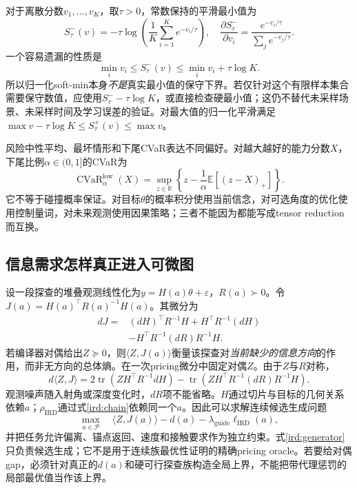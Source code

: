 \documentclass[11pt,a4paper]{article}
\numberwithin{equation}{section}
\theoremstyle{definition}
\DeclareMathOperator{\tr}{tr}
\newcommand{\R}{\mathbb R}
\newcommand{\E}{\mathbb E}
\begin{document}
对于离散分数$v_1,\ldots,v_K$，取$\tau>0$，常数保持的平滑最小值为
\begin{equation}
 S^-_\tau(v)=-\tau\log\left(\frac1K\sum_{i=1}^Ke^{-v_i/\tau}\right),
 \quad
 \frac{\partial S^-_\tau}{\partial v_i}
 =\frac{e^{-v_i/\tau}}{\sum_j e^{-v_j/\tau}}.
 \label{ird:softmin}
\end{equation}
一个容易遗漏的性质是
\begin{equation}
 \min_i v_i\leq S^-_\tau(v)\leq\min_i v_i+\tau\log K.
 \label{ird:softbound}
\end{equation}
所以归一化soft-min本身\emph{不是}真实最小值的保守下界。若仅针对这个有限样本集合需要保守数值，应使用$S^-_\tau-\tau\log K$，或直接检查硬最小值；这仍不替代未采样场景、未采样时间及学习误差的验证。对最大值的归一化平滑满足$\max v-\tau\log K\leq S^+_\tau(v)\leq\max v$。

风险中性平均、最坏情形和下尾CVaR表达不同偏好。对越大越好的能力分数$X$，下尾比例$\alpha\in(0,1]$的CVaR为
\begin{equation}
 \operatorname{CVaR}^{\mathrm{low}}_\alpha(X)
 =\sup_{z\in\R}\left\{z-\frac1\alpha\E[(z-X)_+]\right\}.
 \label{ird:cvar}
\end{equation}
它不等于碰撞概率保证。对目标$\theta$的概率积分使用当前信念，对可选角度的优化使用控制量词，对未来观测使用因果策略；三者不能因为都能写成tensor reduction而互换。

\subsection{信息需求怎样真正进入可微图}
设一段探查的堆叠观测线性化为$y=H(a)\theta+\varepsilon$，$R(a)\succ0$。令$J(a)=H(a)^\top R(a)^{-1}H(a)$。其微分为
\begin{align}
 dJ={}&(dH)^\top R^{-1}H+H^\top R^{-1}(dH)\nonumber\\
 &-H^\top R^{-1}(dR)R^{-1}H.
 \label{ird:dJ}
\end{align}
若编译器对偶给出$Z\succeq0$，则$\langle Z,J(a)\rangle$衡量该探查对\emph{当前缺少的信息方向}的作用，而非无方向的总体熵。在一次pricing微分中固定对偶$Z$。由于$Z$与$R$对称，
\begin{equation}
 d\langle Z,J\rangle
 =2\tr(ZH^\top R^{-1}dH)
 -\tr(ZH^\top R^{-1}(dR)R^{-1}H).
 \label{ird:pricinggradient}
\end{equation}
观测噪声随入射角或深度变化时，$dR$项不能省略。$H$通过切片与目标的几何关系依赖$a$；$\rho_{\mathrm{IRD}}$通过式\eqref{ird:chain}依赖同一个$a$。因此可以求解连续候选生成问题
\begin{equation}
 \max_{a\in\mathcal P}\quad
 \langle Z,J(a)\rangle-d(a)-\lambda_{\mathrm{guide}}\ell_{\mathrm{IRD}}(a),
 \label{ird:generator}
\end{equation}
并把任务允许偏离、锚点返回、速度和接触要求作为独立约束。式\eqref{ird:generator}只负责候选生成；它不是用于连续族最优性证明的精确pricing oracle。若要给对偶gap，必须针对真正的$d(a)$和硬可行探查族构造全局上界，不能把带代理惩罚的局部最优值当作该上界。
\end{document}
